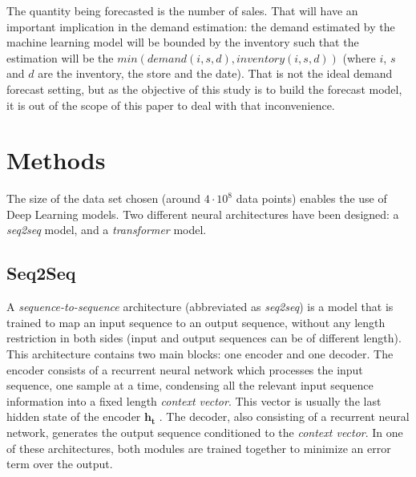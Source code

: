 \documentclass{elsarticle}
\begin{document}
	The quantity being forecasted is the number of sales. That will have an important implication in the demand estimation: the demand estimated by the machine learning model will be bounded by the inventory such that the estimation will be the $min(demand(i,s,d), inventory(i,s,d))$ (where $i$, $s$ and $d$ are the inventory, the store and the date). That is not the ideal demand forecast setting, but as the objective of this study is to build the forecast model, it is out of the scope of this paper to deal with that inconvenience.
	
	\section{Methods}
	The size of the data set chosen (around $4\cdot10^8$ data points) enables the use of Deep Learning models. Two different neural architectures have been designed: a \textit{seq2seq} model, and a \textit{transformer} model.
	
	\subsection{Seq2Seq}  %
	A \textit{sequence-to-sequence} architecture (abbreviated as \textit{seq2seq}) \cite{sutskever2014} is a model that is trained to map an input sequence to an output sequence, without any length restriction in both sides (input and output sequences can be of different length). This architecture contains two main blocks: one encoder and one decoder. The encoder consists of a recurrent neural network which processes the input sequence, one sample at a time, condensing all the relevant input sequence information into a fixed length \textit{context vector}. This vector is usually the last hidden state of the encoder $\mathbf{h_t}$ \cite{kamath2019}. The decoder, also consisting of a recurrent neural network, generates the output sequence conditioned to the \textit{context vector}. In one of these architectures, both modules are trained together to minimize an error term over the output.
	 
\end{document}

